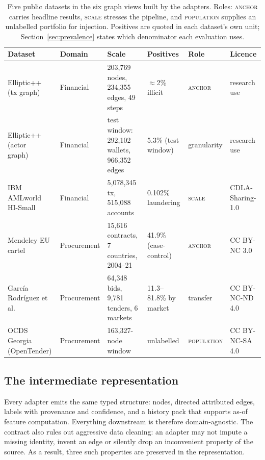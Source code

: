 \documentclass[conference]{IEEEtran}
\begin{document}
\begin{table}[t]
\caption{Five public datasets in the six graph views built by the adapters.
Roles: \textsc{anchor} carries headline results, \textsc{scale} stresses the
pipeline, and \textsc{population} supplies an unlabelled portfolio for
injection. Positives are quoted in each dataset's own unit;
Section~\ref{sec:prevalence} states which denominator each evaluation uses.}
\label{tab:data}
\centering
\footnotesize
\setlength{\tabcolsep}{2.5pt}
\begin{tabular}{llllll}
\toprule
Dataset & Domain & Scale & Positives & Role & Licence \\
\midrule
Elliptic++ (tx graph)~\cite{elmougy2023,weber2019} & Financial & 203,769 nodes, 234,355 edges, 49 steps & $\approx$2\% illicit & \textsc{anchor} & research use \\
Elliptic++ (actor graph)~\cite{elmougy2023} & Financial & test window: 292,102 wallets, 966,352 edges & 5.3\% (test window) & granularity & research use \\
IBM AMLworld HI-Small~\cite{altman2023} & Financial & 5,078,345 tx, 515,088 accounts & 0.102\% laundering & \textsc{scale} & CDLA-Sharing-1.0 \\
Mendeley EU cartel~\cite{mendeleydata2025} & Procurement & 15,616 contracts, 7 countries, 2004--21 & 41.9\% (case-control) & \textsc{anchor} & CC BY-NC 3.0 \\
Garc\'ia Rodr\'iguez et al.~\cite{garcia2022} & Procurement & 64,348 bids, 9,781 tenders, 6 markets & 11.3--81.8\% by market & transfer & CC BY-NC-ND 4.0 \\
OCDS Georgia (OpenTender) & Procurement & 163,327-node window & unlabelled & \textsc{population} & CC BY-NC-SA 4.0 \\
\bottomrule
\end{tabular}
\end{table}

\subsection{The intermediate representation}

Every adapter emits the same typed structure: nodes, directed attributed edges,
labels with provenance and confidence, and a history pack that supports as-of
feature computation. Everything downstream is therefore domain-agnostic. The
contract also rules out aggressive data cleaning: an adapter may not impute a
missing identity, invent an edge or silently drop an inconvenient property of
the source. As a result, three such properties are preserved in the
representation.
\end{document}
